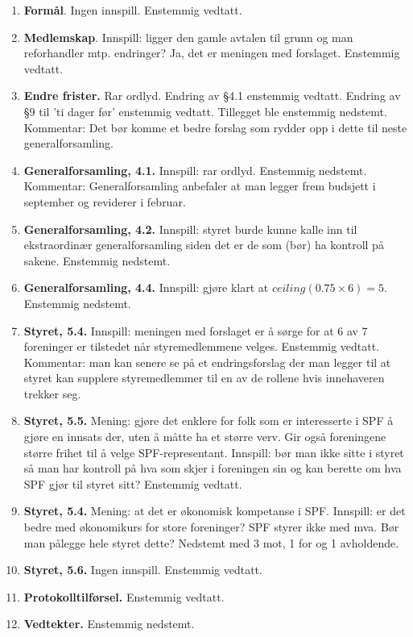 \documentclass{article}[12pt]
\begin{document}
	\begin{enumerate}
	\item \textbf{Formål}. Ingen innspill. Enstemmig vedtatt.
	\item \textbf{Medlemskap}. Innspill: ligger den gamle avtalen til grunn og man reforhandler mtp. endringer?
	 Ja, det er meningen med forslaget. Enstemmig vedtatt.
	 \item \textbf{Endre frister.} Rar ordlyd. Endring av §4.1 enstemmig vedtatt.
	 Endring av §9 til 'ti dager før' enstemmig vedtatt. 
	 Tillegget ble enstemmig nedstemt. 
	 Kommentar: Det bør komme et bedre forslag 
	 som rydder opp i dette til neste generalforsamling.
	 \item \textbf{Generalforsamling, 4.1.} Innspill: rar ordlyd. Enstemmig nedstemt.
	 Kommentar: Generalforsamling anbefaler at man legger frem budsjett i september og
	 reviderer i februar.
	 \item \textbf{Generalforsamling, 4.2.} Innspill: styret burde kunne kalle inn til ekstraordinær generalforsamling siden det er de som (bør) ha kontroll på sakene.
	 Enstemmig nedstemt.
	 \item \textbf{Generalforsamling, 4.4.} 
	 Innspill: gjøre klart at $ceiling(0.75\times 6)=5$.
	 Enstemmig nedstemt.
	 \item \textbf{Styret, 5.4.} Innspill: meningen med forslaget er å sørge for
	 at 6 av 7 foreninger er tilstedet når styremedlemmene velges.
	 Enstemmig vedtatt.
	 Kommentar: man kan senere se på et endringsforslag der man legger til
	 at styret kan supplere styremedlemmer til en av de rollene hvis innehaveren trekker seg.
	 \item \textbf{Styret, 5.5.} Mening: gjøre det enklere for folk som er interesserte
	 i SPF å gjøre en innsats der, uten å måtte ha et større verv. 
	 Gir også foreningene større frihet til å velge SPF-representant.
	 Innspill: bør man ikke sitte i styret så man har kontroll på hva som skjer i foreningen
	 sin og kan berette om hva SPF gjør til styret sitt?
	 Enstemmig vedtatt.
	 \item \textbf{Styret, 5.4.} Mening: at det er økonomisk kompetanse i SPF.
	 Innspill: er det bedre med økonomikurs for store foreninger? SPF styrer ikke med mva.
	 Bør man pålegge hele styret dette?
	 Nedstemt med 3 mot, 1 for og 1 avholdende.
	 \item \textbf{Styret, 5.6.} Ingen innspill. Enstemmig vedtatt.
	 \item \textbf{Protokolltilførsel.} Enstemmig vedtatt.
	 \item \textbf{Vedtekter.} Enstemmig nedstemt.
\end{enumerate}
\end{document}
